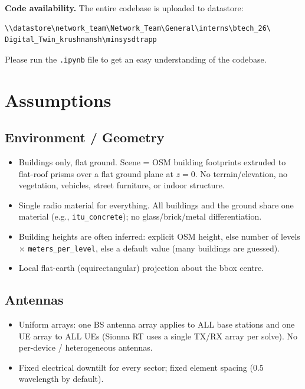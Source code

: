 \documentclass[11pt]{article}
\begin{document}
\medskip
\noindent\textbf{Code availability.} The entire codebase is uploaded to datastore:
\begin{verbatim}
\\datastore\network_team\Network_Team\General\interns\btech_26\
Digital_Twin_krushnansh\minsysdtrapp
\end{verbatim}
Please run the \texttt{.ipynb} file to get an easy understanding of the codebase.

\section{Assumptions}

\subsection{Environment / Geometry}
\begin{itemize}[leftmargin=*]
  \item Buildings only, flat ground. Scene = OSM building footprints extruded to
  flat-roof prisms over a flat ground plane at $z=0$. No terrain/elevation, no
  vegetation, vehicles, street furniture, or indoor structure.
  \item Single radio material for everything. All buildings and the ground share one
  material (e.g., \texttt{itu_concrete}); no glass/brick/metal differentiation.
  \item Building heights are often inferred: explicit OSM height, else number of
  levels $\times$ \texttt{meters_per_level}, else a default value (many buildings are
  guessed).
  \item Local flat-earth (equirectangular) projection about the bbox centre.
\end{itemize}

\subsection{Antennas}
\begin{itemize}[leftmargin=*]
  \item Uniform arrays: one BS antenna array applies to ALL base stations and one UE
  array to ALL UEs (Sionna RT uses a single TX/RX array per solve). No per-device /
  heterogeneous antennas.
  \item Fixed electrical downtilt for every sector; fixed element spacing
  (0.5 wavelength by default).
\end{itemize}
\end{document}
